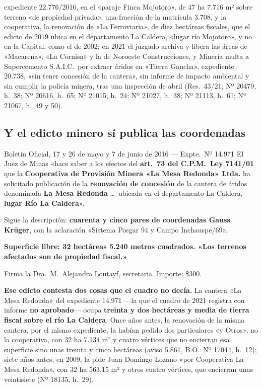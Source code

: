 expediente 22.776/2016, en el «paraje Finca Mojotoro», de 47 ha 7.716 m² sobre terreno «de propiedad privada», una fracción de la matrícula 3.708, y la cooperativa, la renovación de «La Ferroviaria», de diez hectáreas fiscales, que el edicto de 2019 ubica en el departamento La Caldera, «lugar río Mojotoro», y no en la Capital, como el de 2002; en 2021 el juzgado archiva y libera las áreas de «Macarena», «La Cornisa» y la de Noroeste Construcciones, y Minería multa a Supercemento S.A.I.C.\ por extraer áridos en «Tierra Gaucha», expediente 20.738, «sin tener concesión de la cantera», sin informe de impacto ambiental y sin cumplir la policía minera, tras una inspección de abril (Res.\ 43/21; Nº 20479, h.\ 38; Nº 20616, h.\ 65; Nº 21015, h.\ 24; Nº 21027, h.\ 38; Nº 21113, h.\ 61; Nº 21067, h.\ 49 y 50).

\subsection*{Y el edicto minero sí publica las coordenadas}

\begin{ficha}{Boletín Oficial, 17 y 26 de mayo y 7 de junio de 2016 --- Expte.\ Nº 14.971}
El Juez de Minas «hace saber a los efectos del \textbf{art.\ 73 del C.P.M.\ Ley 7141/01} que la \textbf{Cooperativa de Provisión Minera «La Mesa Redonda» Ltda.} ha solicitado publicación de la \textbf{renovación de concesión} de la cantera de áridos denominada \textbf{La Mesa Redonda} \ldots\ ubicada en el departamento La Caldera, \textbf{lugar Río La Caldera}».

Sigue la descripción: \textbf{cuarenta y cinco pares de coordenadas Gauss Krüger}, con la aclaración «Sistema Posgar 94 y Campo Inchauspe/69».

\textbf{Superficie libre: 32 hectáreas 5.240 metros cuadrados. «Los terrenos afectados son de propiedad fiscal.»}

Firma la Dra.\ M.\ Alejandra Loutayf, secretaria. Importe: \$300.
\end{ficha}

\textbf{Ese edicto contesta dos cosas que el cuadro no decía.} La cantera «La Mesa Redonda» del expediente 14.971 ---la que el cuadro de 2021 registra con informe \textbf{no aprobado}--- ocupa \textbf{treinta y dos hectáreas y media de tierra fiscal sobre el río La Caldera}. Once años antes, la renovación de la misma cantera, por el mismo expediente, la habían pedido dos particulares «y Otros», no la cooperativa, con 32 ha 7.134 m² y cuatro vértices que no encierran esa superficie sino unas treinta y cinco hectáreas (aviso 5.861, B.O.\ Nº 17044, h.\ 12); siete años antes, en 2009, la pide Juan Domingo Lozano «por Cooperativa La Mesa Redonda», con 32 ha 563,15 m² y otros cuatro vértices, que encierran unas veintisiete (Nº 18135, h.\ 29).

